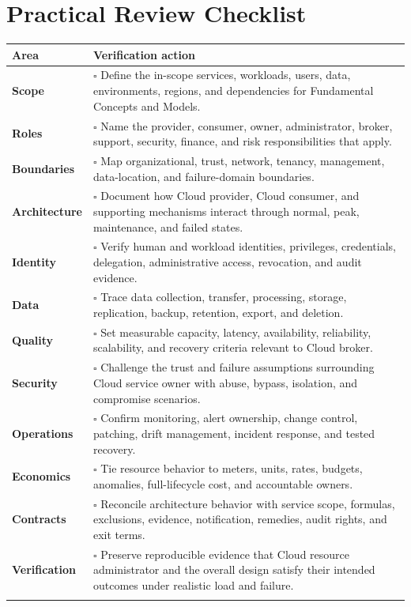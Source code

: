 \documentclass[11pt]{article}
\begin{document}
\section{Practical Review Checklist}
\begin{longtable}{@{}>{\bfseries\color{Teal}}p{}>{\RaggedRight\arraybackslash}p{}@{}}
\toprule\textbf{Area} & \textbf{Verification action}\\\midrule\endhead
Scope & $\square$ Define the in-scope services, workloads, users, data, environments, regions, and dependencies for Fundamental Concepts and Models. \\\addlinespace[2pt]
Roles & $\square$ Name the provider, consumer, owner, administrator, broker, support, security, finance, and risk responsibilities that apply. \\\addlinespace[2pt]
Boundaries & $\square$ Map organizational, trust, network, tenancy, management, data-location, and failure-domain boundaries. \\\addlinespace[2pt]
Architecture & $\square$ Document how Cloud provider, Cloud consumer, and supporting mechanisms interact through normal, peak, maintenance, and failed states. \\\addlinespace[2pt]
Identity & $\square$ Verify human and workload identities, privileges, credentials, delegation, administrative access, revocation, and audit evidence. \\\addlinespace[2pt]
Data & $\square$ Trace data collection, transfer, processing, storage, replication, backup, retention, export, and deletion. \\\addlinespace[2pt]
Quality & $\square$ Set measurable capacity, latency, availability, reliability, scalability, and recovery criteria relevant to Cloud broker. \\\addlinespace[2pt]
Security & $\square$ Challenge the trust and failure assumptions surrounding Cloud service owner with abuse, bypass, isolation, and compromise scenarios. \\\addlinespace[2pt]
Operations & $\square$ Confirm monitoring, alert ownership, change control, patching, drift management, incident response, and tested recovery. \\\addlinespace[2pt]
Economics & $\square$ Tie resource behavior to meters, units, rates, budgets, anomalies, full-lifecycle cost, and accountable owners. \\\addlinespace[2pt]
Contracts & $\square$ Reconcile architecture behavior with service scope, formulas, exclusions, evidence, notification, remedies, audit rights, and exit terms. \\\addlinespace[2pt]
Verification & $\square$ Preserve reproducible evidence that Cloud resource administrator and the overall design satisfy their intended outcomes under realistic load and failure. \\\addlinespace[2pt]
\bottomrule
\end{longtable}
\end{document}
